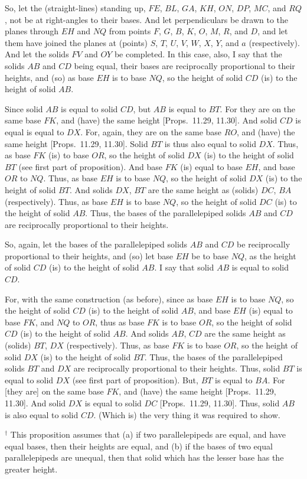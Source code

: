 \begin{Parallel}{}{}
{\epsfysize=3in
\centerline{}

So, let the (straight-lines) standing up, $FE$, $BL$, $GA$, $KH$, $ON$,
$DP$, $MC$, and $RQ$, not be at right-angles to their bases.
And let perpendiculars be drawn to the planes through $EH$ and
$NQ$ from points $F$, $G$, $B$, $K$, $O$, $M$, $R$, and $D$, 
and let them have joined the planes at (points) $S$, $T$, $U$, $V$, $W$,
$X$, $Y$, and $a$ (respectively). And let the solids $FV$ and $OY$
be completed. In this case,  also, I say that the solids $AB$ and
$CD$ being equal, their bases are reciprocally proportional to their
heights, and (so) as base $EH$ is to base $NQ$, so the height of
solid $CD$ (is) to the height of solid $AB$.

Since solid $AB$ is equal to solid $CD$, but $AB$ is equal
to $BT$. For they are on the same base $FK$, and (have) the
same height [Props.~11.29, 11.30]. And solid $CD$ is equal is equal to $DX$. For, again,  they are on the same base $RO$, and (have) the same height [Props.~11.29, 11.30]. Solid
$BT$ is thus also equal to solid $DX$. Thus, as base $FK$ (is) to base $OR$,
so the height of solid $DX$ (is) to the height of solid $BT$ (see first part of 
proposition). And base
$FK$ (is) equal to base $EH$, and base $OR$ to $NQ$. Thus, as base
$EH$ is to base $NQ$, so the height of solid $DX$ (is) to the height
of solid $BT$. And solids $DX$, $BT$ are the same
height as (solids) $DC$,  $BA$ (respectively). Thus, as base $EH$
is to base $NQ$, so the height of solid $DC$ (is) to the height of solid
$AB$.  Thus, the bases of the parallelepiped solids $AB$ and $CD$
are reciprocally proportional to their heights.

So, again, let the bases of the parallelepiped solids $AB$ and $CD$ be
reciprocally proportional to their heights, and (so) let base $EH$ be to base $NQ$,
as the height of solid $CD$ (is) to the height of solid $AB$. I say
that solid $AB$ is equal to solid $CD$.

For, with the same construction (as before), since as base $EH$
is to base $NQ$, so the height of solid $CD$ (is) to the height
of solid $AB$, and base $EH$ (is) equal to base $FK$, and
$NQ$ to $OR$, thus as base $FK$ is to base $OR$, so the height
of solid $CD$ (is) to the height of solid $AB$. And solids $AB$, $CD$ are the same height as (solids) $BT$,  $DX$ (respectively). 
Thus, as base $FK$ is to base $OR$, so the height of solid $DX$ (is)
to the height of solid $BT$. Thus, the bases of the parallelepiped solids $BT$ and $DX$
are reciprocally proportional to their heights. Thus, solid $BT$ is equal to
solid $DX$ (see first part of  proposition). But, $BT$ is equal to $BA$. For [they are] on the same
base $FK$, and (have) the same height [Props.~11.29, 11.30]. And solid $DX$ is equal
to solid $DC$ [Props.~11.29, 11.30]. Thus, solid $AB$ is also equal to solid $CD$. (Which is) the very thing it was required to show.}
\end{Parallel}
{\footnotesize\noindent$^\dag$ This proposition assumes that (a) if
two parallelepipeds are equal, and have equal bases, then their heights are equal,
and (b) if the bases of two equal parallelepipeds are unequal, then that solid which
has the lesser base has the greater height.}

